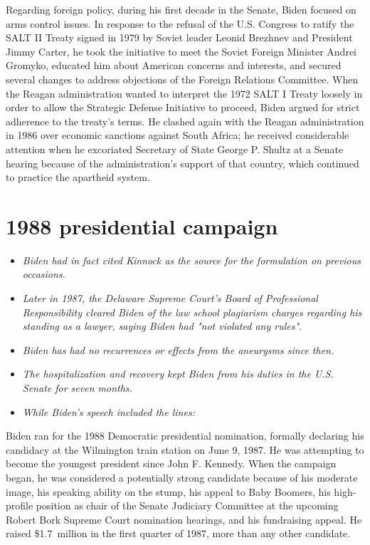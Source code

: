 Regarding foreign policy, during his first decade in the Senate, Biden
focused on arms control issues. In response to the refusal of the U.S.
Congress to ratify the SALT II Treaty signed in 1979 by Soviet leader
Leonid Brezhnev and President Jimmy Carter, he took the initiative to
meet the Soviet Foreign Minister Andrei Gromyko, educated him about
American concerns and interests, and secured several changes to address
objections of the Foreign Relations Committee. When the Reagan
administration wanted to interpret the 1972 SALT I Treaty loosely in
order to allow the Strategic Defense Initiative to proceed, Biden argued
for strict adherence to the treaty's terms. He clashed again with the
Reagan administration in 1986 over economic sanctions against South
Africa; he received considerable attention when he excoriated Secretary
of State George P. Shultz at a Senate hearing because of the
administration's support of that country, which continued to practice
the apartheid system.

\section{1988 presidential campaign}\label{presidential-campaign}

\begin{itemize}
\item
  \emph{Biden had in fact cited Kinnock as the source for the
  formulation on previous occasions.}
\item
  \emph{Later in 1987, the Delaware Supreme Court's Board of
  Professional Responsibility cleared Biden of the law school plagiarism
  charges regarding his standing as a lawyer, saying Biden had "not
  violated any rules".}
\item
  \emph{Biden has had no recurrences or effects from the aneurysms since
  then.}
\item
  \emph{The hospitalization and recovery kept Biden from his duties in
  the U.S. Senate for seven months.}
\item
  \emph{While Biden's speech included the lines:}
\end{itemize}

Biden ran for the 1988 Democratic presidential nomination, formally
declaring his candidacy at the Wilmington train station on June 9, 1987.
He was attempting to become the youngest president since John F.
Kennedy. When the campaign began, he was considered a potentially strong
candidate because of his moderate image, his speaking ability on the
stump, his appeal to Baby Boomers, his high-profile position as chair of
the Senate Judiciary Committee at the upcoming Robert Bork Supreme Court
nomination hearings, and his fundraising appeal. He raised \$1.7~million
in the first quarter of 1987, more than any other candidate.

